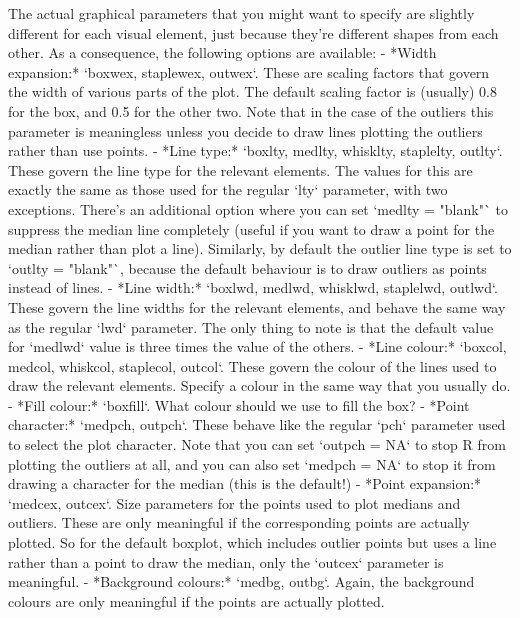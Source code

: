 The actual graphical parameters that you might want to specify are slightly different for each visual element, just because they're different shapes from each other. As a consequence, the following options are available:
 \itemsep 1pt
- *Width expansion:* `boxwex, staplewex, outwex`. These are scaling factors that govern the width of various parts of the plot. The default scaling factor is (usually) 0.8 for the box, and 0.5 for the other two. Note that in the case of the outliers this parameter is meaningless unless you decide to draw lines plotting the outliers rather than use points. 
- *Line type:* `boxlty, medlty, whisklty, staplelty, outlty`. These govern the line type for the relevant elements. The values for this are exactly the same as those used for the regular `lty` parameter, with two exceptions. There's an additional option where you can set `medlty = "blank"` to suppress the median line completely (useful if you want to draw a point for the median rather than plot a line). Similarly, by default the outlier line type is set to `outlty = "blank"`, because the default behaviour is to draw outliers as points instead of lines.
- *Line width:* `boxlwd, medlwd, whisklwd, staplelwd, outlwd`. These govern the line widths for the relevant elements, and behave the same way as the regular `lwd` parameter. The only thing to note is that the default value for `medlwd` value is three times the value of the others.
- *Line colour:* `boxcol, medcol, whiskcol, staplecol, outcol`. These govern the colour of the lines used to draw the relevant elements. Specify a colour in the same way that you usually do.
- *Fill colour:* `boxfill`. What colour should we use to fill the box? 
- *Point character:* `medpch, outpch`. These behave like the regular `pch` parameter used to select the plot character. Note that you can set `outpch = NA` to stop R from plotting the outliers at all, and you can also set `medpch = NA` to stop it from drawing a character for the median (this is the default!) 
- *Point expansion:* `medcex, outcex`. Size parameters for the points used to plot medians and outliers. These are only meaningful if the corresponding points are actually plotted. So for the default boxplot, which includes outlier points but uses a line rather than a point to draw the median, only the `outcex` parameter is meaningful.
- *Background colours:* `medbg, outbg`. Again, the background colours are only meaningful if the points are actually plotted.

